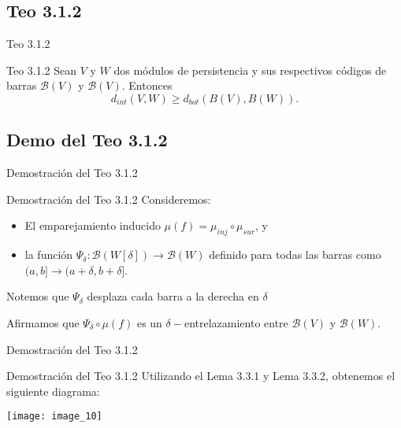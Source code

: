 \documentclass{beamer}
\begin{document}
\subsection{Teo 3.1.2}
\begin{frame}{Teo 3.1.2}
    \begin{block}{Teo 3.1.2}
        Sean $V$ y $W$ dos módulos de persistencia y sus respectivos códigos de barras $\mathcal{B}(V)$ y $\mathcal{B}(V)$. Entonces $$d_{int}(V,W) \geq d_{bot}(B(V),B(W)).$$ 

    \end{block}
\end{frame}

\subsection{Demo del Teo 3.1.2}
\begin{frame}{Demostración del Teo 3.1.2}
    \begin{block}{Demostración del Teo 3.1.2}
        Consideremos:
        \begin{itemize}
            \item El emparejamiento inducido $\mu(f) = \mu_{inj}\circ\mu_{sur}$, y
            \pause
            
            \item la función $\Psi_{\delta}: \mathcal{B}(W[\delta])\to \mathcal{B}(W)$ definido para todas las barras como $(a, b]\to(a+\delta,b+\delta]$.
        \end{itemize}
        \pause
        
        Notemos que $\Psi_{\delta}$ desplaza cada barra a la derecha en $\delta$ 
        \pause
        
        Afirmamos que $\Psi_{\delta}\circ\mu(f)$ es un $\delta-$entrelazamiento entre $\mathcal{B}(V)$ y $\mathcal{B}(W)$. 

    \end{block}
\end{frame}

\begin{frame}{Demostración del Teo 3.1.2}
    \begin{block}{Demostración del Teo 3.1.2}
        Utilizando el Lema 3.3.1 y Lema 3.3.2, obtenemos el siguiente diagrama: 
        \pause
        
        \texttt{[image: image\_10]}
        
        
    \end{block}
\end{frame}
\end{document}

